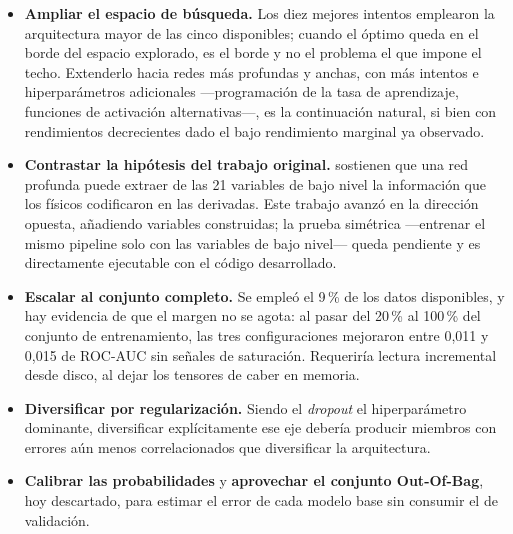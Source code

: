 \documentclass[12pt,a4paper]{article}
\begin{document}
\begin{itemize}[leftmargin=1.5em,itemsep=0.3em]
  \item \textbf{Ampliar el espacio de búsqueda.} Los diez mejores intentos emplearon la
  arquitectura mayor de las cinco disponibles; cuando el óptimo queda en el borde del espacio
  explorado, es el borde y no el problema el que impone el techo. Extenderlo hacia redes más
  profundas y anchas, con más intentos e hiperparámetros adicionales ---programación de la tasa de
  aprendizaje, funciones de activación alternativas---, es la continuación natural, si bien con
  rendimientos decrecientes dado el bajo rendimiento marginal ya observado.

  \item \textbf{Contrastar la hipótesis del trabajo original.} \citet{baldi2014} sostienen que una
  red profunda puede extraer de las 21 variables de bajo nivel la información que los físicos
  codificaron en las derivadas. Este trabajo avanzó en la dirección opuesta, añadiendo variables
  construidas; la prueba simétrica ---entrenar el mismo pipeline solo con las variables de bajo
  nivel--- queda pendiente y es directamente ejecutable con el código desarrollado.

  \item \textbf{Escalar al conjunto completo.} Se empleó el 9\,\% de los datos disponibles, y hay
  evidencia de que el margen no se agota: al pasar del 20\,\% al 100\,\% del conjunto de
  entrenamiento, las tres configuraciones mejoraron entre 0,011 y 0,015 de ROC-AUC sin señales de
  saturación. Requeriría lectura incremental desde disco, al dejar los tensores de caber en
  memoria.

  \item \textbf{Diversificar por regularización.} Siendo el \emph{dropout} el hiperparámetro
  dominante, diversificar explícitamente ese eje debería producir miembros con errores aún menos
  correlacionados que diversificar la arquitectura.

  \item \textbf{Calibrar las probabilidades} y \textbf{aprovechar el conjunto Out-Of-Bag}, hoy
  descartado, para estimar el error de cada modelo base sin consumir el de validación.
\end{itemize}
\end{document}
